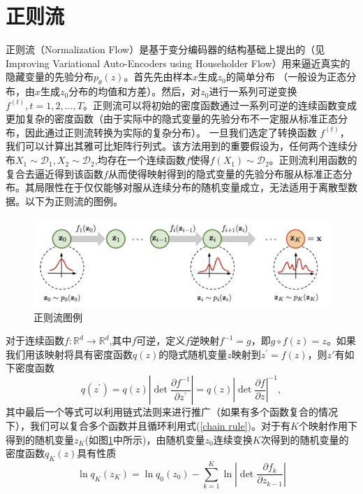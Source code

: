 \section{正则流}
正则流（Normalization Flow）是基于变分编码器的结构基础上提出的（见Improving Variational Auto-Encoders
using Householder Flow）用来逼近真实的隐藏变量的先验分布$p_{\theta}(z)$。首先先由样本$x$生成$z_0$的简单分布
（一般设为正态分布，由$x$生成$z_0$分布的均值和方差）。然后，对$z_0$进行一系列可逆变换$f^{(t)},t=1,2,\dots,T$。正则流可以将初始的密度函数通过一系列可逆的连续函数变成更加复杂的密度函数（由于实际中的隐式变量的先验分布不一定服从标准正态分布，因此通过正则流转换为实际的复杂分布）。 一旦我们选定了转换函数
$f^{(t)}$， 我们可以计算出其雅可比矩阵行列式。该方法用到的重要假设为，任何两个连续分布$X_1\sim \mathcal{D}_1,X_2\sim \mathcal{D}_2$,均存在一个连续函数$f$使得$f(X_1)\sim \mathcal{D_2}$。正则流利用函数的复合去逼近得到该函数$f$从而使得映射得到的隐式变量的先验分布服从标准正态分布。其局限性在于仅仅能够对服从连续分布的随机变量成立，无法适用于离散型数据。以下为正则流的图例。
\begin{figure}[H]
    \centering
    \includegraphics[scale=0.15]{ThuThesis_ Tsinghua University Thesis LaTeX Template/Picture/norm_flow.png}
    \caption{正则流图例}
    \label{Norm_flow}
\end{figure}
对于连续函数$f:\mathbb{R}^{d}\rightarrow \mathbb{R}^d$,其中$f$可逆，定义$f$逆映射$f^{-1}=g$，即$g\circ f(z)=z$。如果我们用该映射将具有密度函数$q(z)$的隐式随机变量$z$映射到$z^{\prime}=f(z)$，则$z'$有如下密度函数
\begin{equation}
    q(z^{\prime}) = q(z)|\operatorname{det}\frac{\partial f^{-1}}{\partial z^{\prime}}|= q(z)|\operatorname{det}\frac{\partial f}{\partial z}|^{-1},
    \label{chain rule}
\end{equation}
其中最后一个等式可以利用链式法则来进行推广（如果有多个函数复合的情况下），我们可以复合多个函数并且循环利用式(\ref{chain rule})。对于有$K$个映射作用下得到的随机变量$z_{K}$(如图\ref{Norm_flow}中所示)，由随机变量$z_0$连续变换$K$次得到的随机变量的密度函数$q_{K}(z)$具有性质
\begin{equation}
    \ln q_{K}(z_{K}) = \ln q_{0}(z_0)-\sum_{k=1}^{K}\ln |\operatorname{det}\frac{\partial f_k}{\partial z_{k-1}}|
    \label{chain log likelihood}
\end{equation}
